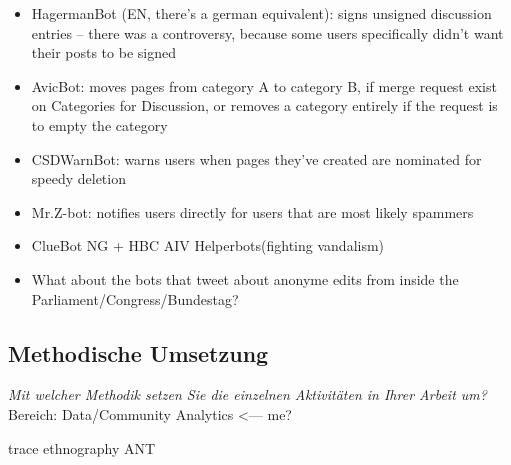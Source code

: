 \documentclass[pdftex,a4paper,11pt]{scrartcl}
\begin{document}
\begin{itemize}
  \item HagermanBot (EN, there's a german equivalent): signs unsigned discussion entries -- there was a
  controversy, because some users specifically didn't want their posts to be
  signed
  \item AvicBot: moves pages from category A to category B, if merge request exist on Categories for Discussion, or removes a category entirely if the request is to empty the category
  \item CSDWarnBot: warns users when pages they've created are nominated for speedy deletion
  \item Mr.Z-bot: notifies users directly for users that are most likely spammers
  \item ClueBot NG + HBC AIV Helperbots(fighting vandalism)
  \item What about the bots that tweet about anonyme edits from inside the Parliament/Congress/Bundestag?
\end{itemize}

\subsection{Methodische Umsetzung}
\noindent \emph{Mit welcher Methodik setzen Sie die einzelnen Aktivitäten in Ihrer Arbeit um?}
Bereich: Data/Community Analytics <--- me?

trace ethnography
ANT

\begin{comment}
\begin{itemize}
	\item Eine wesentliche Grundlage der wissenschaftlichen Arbeit, ist die systematische Anwendung einer Forschungsmethode. Die erlaubt Ihnen ein systematisches Vorgehen bei Ihrer Masterarbeit.
	\item Am HCC.lab werden Arbeiten in den folgenden Bereichen geschrieben:
	       \begin{itemize}
				\item Information Retrieval
				\item Recommender Systeme
				\item Data/Community Analytics <--- me?
				\item Information Visualization
				\item Interaction Design
			\end{itemize}
	\item Sie sollten in der Lage sein, Ihre Arbeit in einen dieser Bereiche einzuordnen. Falls Sie Probleme dabei haben, wenden Sie sich bitte an Ihre/n Betreuer/in.
	\item Für die Auswahl der geeigneten Forschungsmethode verweise ich Sie auf zwei Bücher hin, die eine Zusammenstellung der verfügbaren Methoden und ihre praktischen Anwendung im Bereich Human-Computer Interaction diskutieren \cite{olson2014ways}, \cite{lazar2010research}. Beide Bücher sind bei Frau Prof. Müller-Birn verfügbar. Einzelne Artikel könnten Ihnen auch in einer elektronischen Version zur Verfügung gestellt werden.
\end{itemize}
\end{comment}
\end{document}
